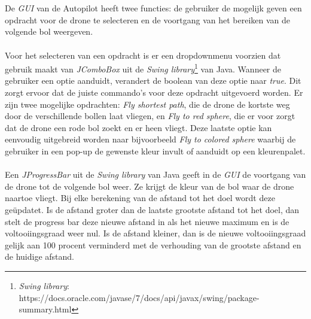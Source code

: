 \\
\\
De \textit{GUI} van de Autopilot heeft twee functies: de gebruiker de mogelijk geven een opdracht voor de drone te selecteren en de voortgang van het bereiken van de volgende bol weergeven.
\\
\\
Voor het selecteren van een opdracht is er een dropdownmenu voorzien dat gebruik maakt van \textit{JComboBox} uit de \textit{Swing library}\footnote{\textit{Swing library}: https://docs.oracle.com/javase/7/docs/api/javax/swing/package-summary.html} van Java. Wanneer de gebruiker een optie aanduidt, verandert de boolean van deze optie naar \textit{true}. Dit zorgt ervoor dat de juiste commando's voor deze opdracht uitgevoerd worden. Er zijn twee mogelijke opdrachten: \textit{Fly shortest path}, die de drone de kortste weg door de verschillende bollen laat vliegen, en \textit{Fly to red sphere}, die er voor zorgt dat de drone een rode bol zoekt en er heen vliegt. Deze laatste optie kan eenvoudig uitgebreid worden naar bijvoorbeeld \textit{Fly to colored sphere} waarbij de gebruiker in een pop-up de gewenste kleur invult of aanduidt op een kleurenpalet. 
\\
\\
Een \textit{JProgressBar} uit de \textit{Swing library} van Java geeft in de \textit{GUI} de voortgang van de drone tot de volgende bol weer. Ze krijgt de kleur van de bol waar  de drone naartoe vliegt. Bij elke berekening van de afstand tot het doel wordt deze ge\"{u}pdatet. Is de afstand groter dan de laatste grootste afstand tot het doel, dan stelt de progress bar deze nieuwe afstand in als het nieuwe maximum en is de voltooiingsgraad weer nul. Is de afstand kleiner, dan is de nieuwe voltooiingsgraad gelijk aan 100 procent verminderd met de verhouding van de grootste afstand en de huidige afstand.  
